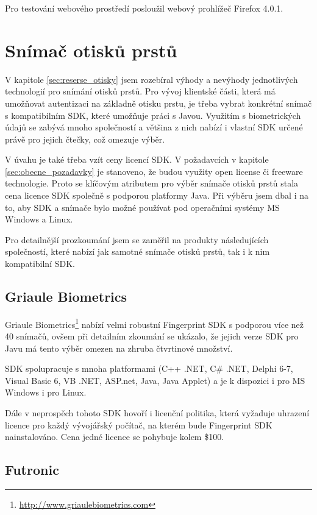 \documentclass[11pt,twoside,a4paper]{book}
\begin{document}
Pro testování webového prostředí posloužil webový prohlížeč Firefox 4.0.1.



\section{Snímač otisků prstů}

V kapitole \ref{sec:reserse_otisky} jsem rozebíral výhody a nevýhody jednotlivých technologií pro snímání otisků prstů. Pro vývoj klientské části, která má umožňovat autentizaci na základně otisku prstu, je třeba vybrat konkrétní snímač s kompatibilním SDK, které umožňuje práci s Javou. Využitím s biometrických údajů se zabývá mnoho společností a většina z nich nabízí i vlastní SDK určené právě pro jejich čtečky, což omezuje výběr. 

V úvahu je také třeba vzít ceny licencí SDK. V požadavcích v kapitole \ref{sec:obecne_pozadavky} je stanoveno, že budou využity open license či freeware technologie. Proto se klíčovým atributem pro výběr snímače otisků prstů stala cena licence SDK společně s podporou platformy Java. Při výběru jsem dbal i na to, aby SDK a snímače bylo možné používat pod operačními systémy MS Windows a Linux.

Pro detailnější prozkoumání jsem se zaměřil na produkty následujících společností, které nabízí jak samotné snímače otisků prstů, tak i k nim kompatibilní SDK.

\subsection{Griaule Biometrics}

Griaule Biometrics\footnote{\url{http://www.griaulebiometrics.com}} nabízí velmi robustní Fingerprint SDK s podporou více než 40 snímačů, ovšem při detailním zkoumání se ukázalo, že jejich verze SDK pro Javu má tento výběr omezen na zhruba čtvrtinové množství. 

SDK spolupracuje s mnoha platformami (C++ .NET, C\# .NET, Delphi 6-7, Visual Basic 6, VB .NET, ASP.net, Java, Java Applet) a je k dispozici i pro MS Windows i pro Linux. 

Dále v neprospěch tohoto SDK hovoří i licenční politika, která vyžaduje uhrazení licence pro každý vývojářský počítač, na kterém bude Fingerprint SDK nainstalováno. Cena jedné licence se pohybuje kolem \$100.

\subsection{Futronic}
\end{document}
